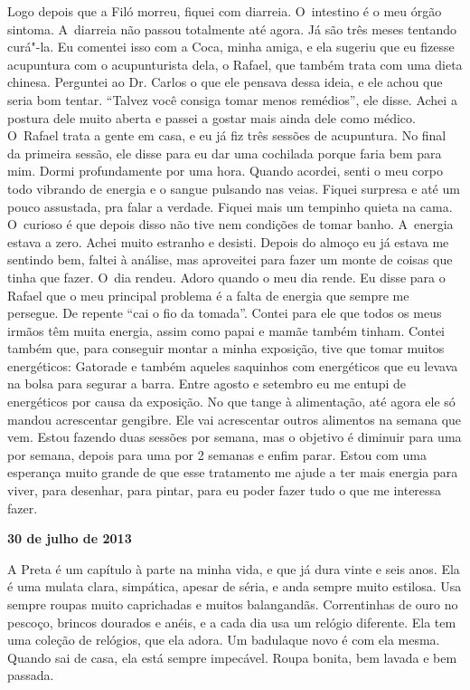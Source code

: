 Logo depois que a Filó morreu, fiquei com diarreia. O~intestino é o meu
órgão sintoma. A~diarreia não passou totalmente até agora. Já são três
meses tentando curá"-la. Eu comentei isso com a Coca, minha amiga, e ela
sugeriu que eu fizesse acupuntura com o acupunturista dela, o Rafael,
que também trata com uma dieta chinesa. Perguntei ao Dr. Carlos o que
ele pensava dessa ideia, e ele achou que seria bom tentar. ``Talvez você
consiga tomar menos remédios'', ele disse. Achei a postura dele muito
aberta e passei a gostar mais ainda dele como médico. O~Rafael trata a
gente em casa, e eu já fiz três sessões de acupuntura. No final da
primeira sessão, ele disse para eu dar uma cochilada porque faria bem
para mim. Dormi profundamente por uma hora. Quando acordei, senti o meu
corpo todo vibrando de energia e o sangue pulsando nas veias. Fiquei
surpresa e até um pouco assustada, pra falar a verdade. Fiquei mais um
tempinho quieta na cama. O~curioso é que depois disso não tive nem
condições de tomar banho. A~energia estava a zero. Achei muito estranho
e desisti. Depois do almoço eu já estava me sentindo bem, faltei à
análise, mas aproveitei para fazer um monte de coisas que tinha que
fazer. O~dia rendeu. Adoro quando o meu dia rende. Eu disse para o
Rafael que o meu principal problema é a falta de energia que sempre me
persegue. De repente ``cai o fio da tomada''. Contei para ele que todos
os meus irmãos têm muita energia, assim como papai e mamãe também
tinham. Contei também que, para conseguir montar a minha exposição, tive
que tomar muitos energéticos: Gatorade e também aqueles saquinhos com
energéticos que eu levava na bolsa para segurar a barra. Entre agosto e
setembro eu me entupi de energéticos por causa da exposição. No que
tange à alimentação, até agora ele só mandou acrescentar gengibre. Ele
vai acrescentar outros alimentos na semana que vem. Estou fazendo duas
sessões por semana, mas o objetivo é diminuir para uma por semana,
depois para uma por 2 semanas e enfim parar. Estou com uma esperança
muito grande de que esse tratamento me ajude a ter mais energia para
viver, para desenhar, para pintar, para eu poder fazer tudo o que me
interessa fazer.

\begin{center}\asterisc{}\textbf{}\end{center}

\begin{flushright}\textbf{30 de julho de 2013}\end{flushright}


A Preta é um capítulo à parte na minha vida, e que já dura vinte e seis
anos. Ela é uma mulata clara, simpática, apesar de séria, e anda sempre
muito estilosa. Usa sempre roupas muito caprichadas e muitos
balangandãs. Correntinhas de ouro no pescoço, brincos dourados e anéis,
e a cada dia usa um relógio diferente. Ela tem uma coleção de relógios,
que ela adora. Um badulaque novo é com ela mesma. Quando sai de casa,
ela está sempre impecável. Roupa bonita, bem lavada e bem passada.

